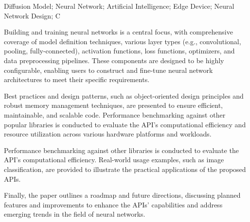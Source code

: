 \begin{abstractEng}{Diffusion Model; Neural Network; Artificial Intelligence; Edge Device; Neural Network Design; C}
    \par Building and training neural networks is a central focus, 
    with comprehensive coverage of model definition techniques, various layer types 
    (e.g., convolutional, pooling, fully-connected), activation functions, loss functions, optimizers, and data preprocessing pipelines. 
    These components are designed to be highly configurable, 
    enabling users to construct and fine-tune neural network architectures to meet their specific requirements.

    \par Best practices and design patterns, such as object-oriented design principles and robust memory management techniques, 
    are presented to ensure efficient, maintainable, and scalable code. 
    Performance benchmarking against other popular libraries is conducted to 
    evaluate the API's computational efficiency and resource utilization across various hardware platforms and workloads.

    \par Performance benchmarking against other libraries is conducted to evaluate the API's computational efficiency. 
    Real-world usage examples, such as image classification, are provided to illustrate the practical applications of the proposed APIs.

    \par Finally, the paper outlines a roadmap and future directions, 
    discussing planned features and improvements to enhance the APIs' capabilities and address emerging trends in the field of neural networks.
\end{abstractEng}
